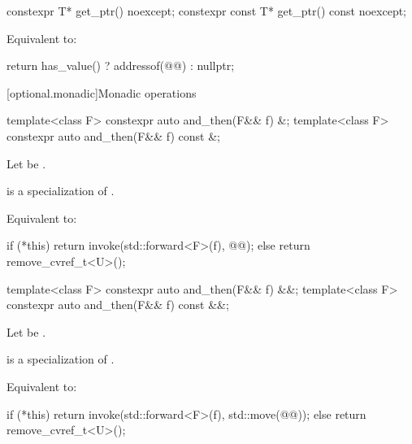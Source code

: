 %
\begin{itemdecl}
constexpr T* get_ptr() noexcept;
constexpr const T* get_ptr() const noexcept;
\end{itemdecl}

\begin{itemdescr}
\pnum
\effects
Equivalent to:
\begin{codeblock}
return has_value() ? addressof(@@) : nullptr;
\end{codeblock}
\end{itemdescr}

[optional.monadic]{Monadic operations}

\begin{itemdecl}
template<class F> constexpr auto and_then(F&& f) &;
template<class F> constexpr auto and_then(F&& f) const &;
\end{itemdecl}

\begin{itemdescr}
\pnum
Let  be .

\pnum
\mandates
{} is a specialization of .

\pnum
\effects
Equivalent to:
\begin{codeblock}
if (*this) {
  return invoke(std::forward<F>(f), @@);
} else {
  return remove_cvref_t<U>();
}
\end{codeblock}
\end{itemdescr}

\begin{itemdecl}
template<class F> constexpr auto and_then(F&& f) &&;
template<class F> constexpr auto and_then(F&& f) const &&;
\end{itemdecl}

\begin{itemdescr}
\pnum
Let  be .

\pnum
\mandates
{} is a specialization of .

\pnum
\effects
Equivalent to:
\begin{codeblock}
if (*this) {
  return invoke(std::forward<F>(f), std::move(@@));
} else {
  return remove_cvref_t<U>();
}
\end{codeblock}
\end{itemdescr}

